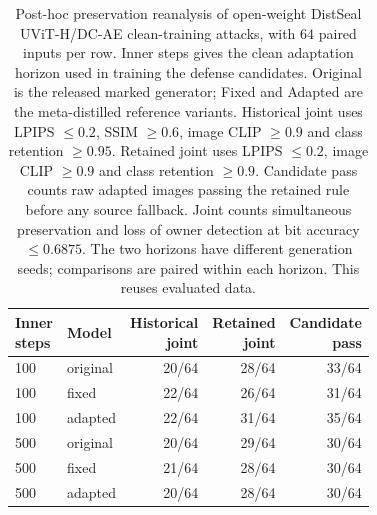 \begin{table}[ht]\centering\small
\begin{tabular}{llrrr}\toprule
\shortstack{Inner\\steps} & Model & \shortstack{Historical\\joint} & \shortstack{Retained\\joint} & \shortstack{Candidate\\pass}\\\midrule
100 & original & 20/64 & 28/64 & 33/64\\
100 & fixed & 22/64 & 26/64 & 31/64\\
100 & adapted & 22/64 & 31/64 & 35/64\\
500 & original & 20/64 & 29/64 & 30/64\\
500 & fixed & 21/64 & 28/64 & 30/64\\
500 & adapted & 20/64 & 28/64 & 30/64\\
\bottomrule\end{tabular}
\caption{Post-hoc preservation reanalysis of open-weight DistSeal UViT-H/DC-AE clean-training attacks, with 64 paired inputs per row. Inner steps gives the clean adaptation horizon used in training the defense candidates. Original is the released marked generator; Fixed and Adapted are the meta-distilled reference variants. Historical joint uses LPIPS $\leq0.2$, SSIM $\geq0.6$, image CLIP $\geq0.9$ and class retention $\geq0.95$. Retained joint uses LPIPS $\leq0.2$, image CLIP $\geq0.9$ and class retention $\geq0.9$. Candidate pass counts raw adapted images passing the retained rule before any source fallback. Joint counts simultaneous preservation and loss of owner detection at bit accuracy $\leq0.6875$. The two horizons have different generation seeds; comparisons are paired within each horizon. This reuses evaluated data.}\end{table}

